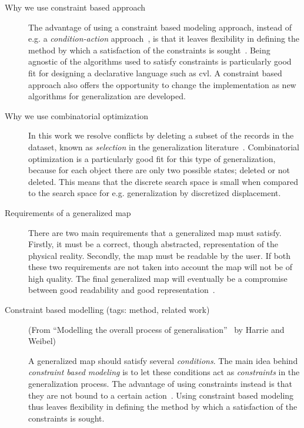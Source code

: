 \documentclass[11pt, oneside]{article}   	%
\begin{document}
\begin{description}

\item[Why we use constraint based approach]

The advantage of using a constraint based modeling approach, instead of e.g. a \emph{condition-action} approach~\cite{harrie2007modelling}, is that it leaves flexibility in defining the method by which a satisfaction of the constraints is sought~\cite{beard1991constraints}. Being agnostic of the algorithms used to satisfy constraints is particularly good fit for designing a declarative language such as cvl. A constraint based approach also offers the opportunity to change the implementation as new algorithms for generalization are developed.

\item[Why we use combinatorial optimization] In this work we resolve conflicts by deleting a subset of the records in the dataset, known as \emph{selection} in the generalization literature~\cite{weibel1999generalising}. Combinatorial optimization is a particularly good fit for this type of generalization, because for each object there are only two possible states; deleted or not deleted. This means that the discrete search space is small when compared to the search space for e.g. generalization by discretized displacement.



\item[Requirements of a generalized map] There are two main requirements that a generalized map must satisfy. Firstly, it must be a correct, though abstracted, representation of the physical reality. Secondly, the map must be readable by the user. If both these two requirements are not taken into account the map will not be of high quality. The final generalized map will eventually be a compromise between good readability and good representation~\cite{harrie2007modelling}.

\item[Constraint based modelling (tags: method, related work)]  (From ``Modelling the overall process of generalisation''~\cite{harrie2007modelling} by Harrie and Weibel) 

A generalized map should satisfy several \emph{conditions}. The main idea behind \emph{constraint based modeling} is to let these conditions act as \emph{constraints} in the generalization process. The advantage of using constraints instead is that they are not bound to a certain action~\cite{beard1991constraints}. Using constraint based modeling thus leaves flexibility in defining the method by which a satisfaction of the constraints is sought.


\end{description}
\end{document}
